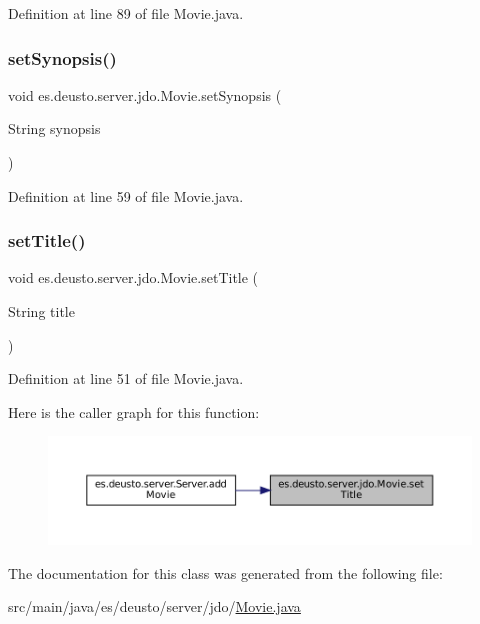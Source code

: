 Definition at line 89 of file Movie.\+java.

\mbox{\label{classes_1_1deusto_1_1server_1_1jdo_1_1_movie_a8bc588baca5c14a900a83d8a0326542c}} 
\subsubsection{\texorpdfstring{setSynopsis()}{setSynopsis()}}
{\footnotesize\ttfamily void es.\+deusto.\+server.\+jdo.\+Movie.\+set\+Synopsis (\begin{DoxyParamCaption}\item[{String}]{synopsis }\end{DoxyParamCaption})}



Definition at line 59 of file Movie.\+java.

\mbox{\label{classes_1_1deusto_1_1server_1_1jdo_1_1_movie_ae5ef76349074d7d94803152daacc9e54}} 
\subsubsection{\texorpdfstring{setTitle()}{setTitle()}}
{\footnotesize\ttfamily void es.\+deusto.\+server.\+jdo.\+Movie.\+set\+Title (\begin{DoxyParamCaption}\item[{String}]{title }\end{DoxyParamCaption})}



Definition at line 51 of file Movie.\+java.

Here is the caller graph for this function\+:
\nopagebreak
\begin{figure}[H]
\begin{center}
\leavevmode
\includegraphics[width=350pt]{classes_1_1deusto_1_1server_1_1jdo_1_1_movie_ae5ef76349074d7d94803152daacc9e54_icgraph}
\end{center}
\end{figure}


The documentation for this class was generated from the following file\+:\begin{DoxyCompactItemize}
\item 
src/main/java/es/deusto/server/jdo/\mbox{\hyperlink{_movie_8java}{Movie.\+java}}\end{DoxyCompactItemize}
